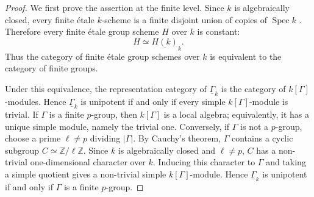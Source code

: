 \documentclass[12pt,a4]{amsart}
\theoremstyle{definition}
\begin{document}
\begin{proof}
	We first prove the assertion at the finite level. Since \(k\) is algebraically closed, every finite \'{e}tale \(k\)-scheme is a
	finite disjoint union of copies of \(\operatorname{Spec} k\)
	\cite[Tag 04GL]{Stack}. Therefore every finite \'{e}tale group scheme
	\(H\) over \(k\) is constant:
	\[
	H\simeq \underline{H(k)}_k .
	\]
	Thus the category of finite \'{e}tale group schemes over \(k\) is equivalent to
	the category of finite groups.
	
	Under this equivalence, the representation category of
	\(\underline{\Gamma}_k\) is the category of \(k[\Gamma]\)-modules. Hence
	\(\underline{\Gamma}_k\) is unipotent if and only if every simple
	\(k[\Gamma]\)-module is trivial. If \(\Gamma\) is a finite \(p\)-group, then
	\(k[\Gamma]\) is a local algebra; equivalently, it has a unique simple module,
	namely the trivial one. Conversely, if \(\Gamma\) is not a \(p\)-group, choose a
	prime \(\ell\neq p\) dividing \(|\Gamma|\). By Cauchy's theorem, \(\Gamma\)
	contains a cyclic subgroup \(C\simeq \mathbb Z/\ell\mathbb Z\). Since \(k\) is
	algebraically closed and \(\ell\neq p\), \(C\) has a non-trivial
	one-dimensional character over \(k\). Inducing this character to \(\Gamma\) and
	taking a simple quotient gives a non-trivial simple \(k[\Gamma]\)-module. Hence
	\(\underline{\Gamma}_k\) is unipotent if and only if \(\Gamma\) is a finite
	\(p\)-group.
	

\end{proof}
\end{document}
